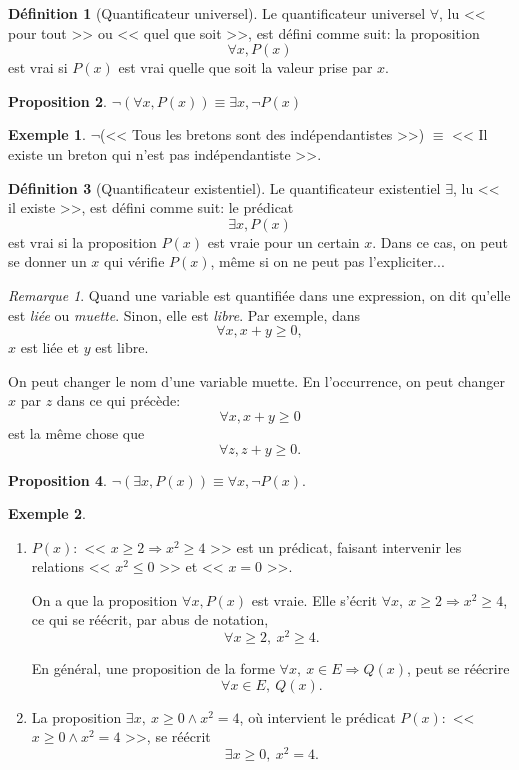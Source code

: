 \documentclass[11pt]{article}
\theoremstyle{definition}
\newtheorem{defn}{Définition}[section]
\newtheorem{prop}[defn]{Proposition}
\newtheorem{exe}{Exemple}
\theoremstyle{remark}
\newtheorem{rem}{Remarque}
\begin{document}
\begin{defn}[Quantificateur universel]
Le quantificateur universel $\forall$, lu << pour tout >> ou << quel que soit >>, est défini comme suit: la proposition
\[ \forall x,P(x)\]
est vrai si $P(x)$ est vrai quelle que soit la valeur prise par $x$.
\end{defn}

\begin{prop}
	$\neg(\forall x,P(x)) \equiv \exists x,\neg P(x)$
\end{prop}

\begin{exe}
	$\neg$(<< Tous les bretons sont des indépendantistes >>) $\equiv$ << Il existe un breton qui n'est pas indépendantiste >>.
\end{exe}

\begin{defn}[Quantificateur existentiel]
Le quantificateur existentiel $\exists$, lu << il existe >>, est défini comme suit: le prédicat
\[ \exists x,P(x)\]
est vrai si la proposition $P(x)$ est vraie pour un certain $x$. Dans ce cas, on peut se donner un $x$ qui vérifie $P(x)$, même si on ne peut pas l'expliciter...
\end{defn}

\begin{rem}
	Quand une variable est quantifiée dans une expression, on dit qu'elle est \textit{liée} ou \textit{muette}. Sinon, elle est \textit{libre}. Par exemple, dans
	\[ \forall x,x+y \geq 0, \]
	$x$ est liée et $y$ est libre.
	
	On peut changer le nom d'une variable muette. En l'occurrence, on peut changer $x$ par $z$ dans ce qui précède:
	\[ \forall x,x+y \geq 0 \]
	est la même chose que
	\[ \forall z,z+y \geq 0. \]
\end{rem}

\begin{prop}
	$\neg(\exists x,P(x))\equiv \forall x,\neg P(x). $
\end{prop}

\begin{exe}\begin{enumerate}
		\item $P(x) :$ << $x \geq 2 \Rightarrow x^2 \geq 4$ >> est un prédicat, faisant intervenir les relations << $x^2\leq 0$ >> et << $ x=0$ >>.
		
		On a que la proposition $\forall x,P(x)$ est vraie. Elle s'écrit $\forall x,\ x\geq 2\Rightarrow x^2\geq 4 $, ce qui se réécrit, par abus de notation,
		\[ \forall x\geq2,\ x^2\geq 4. \]
		
		En général, une proposition de la forme $\forall x,\ x\in E\Rightarrow Q(x)$, peut se réécrire
		\[ \forall x\in E,\ Q(x). \]
		
		\item La proposition $\exists x,\ x\geq 0\land x^2=4 $, où intervient le prédicat $P(x):$ << $x\geq 0\land x^2=4 $ >>, se réécrit
		\[ \exists x\geq 0,\ x^2=4. \]
	\end{enumerate}	
\end{exe}
\end{document}
